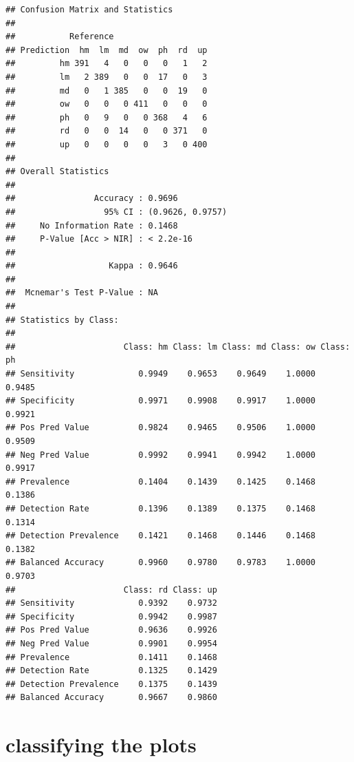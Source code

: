 \documentclass[
]{article}
\newenvironment{Shaded}{\begin{snugshade}}{\end{snugshade}}
\newcommand{\CommentTok}[1]{\textcolor[rgb]{0.56,0.35,0.01}{\textit{#1}}}
\newcommand{\FunctionTok}[1]{\textcolor[rgb]{0.13,0.29,0.53}{\textbf{#1}}}
\newcommand{\NormalTok}[1]{#1}
\newcommand{\SpecialCharTok}[1]{\textcolor[rgb]{0.81,0.36,0.00}{\textbf{#1}}}
\begin{document}
\begin{Shaded}
\end{Shaded}

\begin{verbatim}
## Confusion Matrix and Statistics
## 
##           Reference
## Prediction  hm  lm  md  ow  ph  rd  up
##         hm 391   4   0   0   0   1   2
##         lm   2 389   0   0  17   0   3
##         md   0   1 385   0   0  19   0
##         ow   0   0   0 411   0   0   0
##         ph   0   9   0   0 368   4   6
##         rd   0   0  14   0   0 371   0
##         up   0   0   0   0   3   0 400
## 
## Overall Statistics
##                                           
##                Accuracy : 0.9696          
##                  95% CI : (0.9626, 0.9757)
##     No Information Rate : 0.1468          
##     P-Value [Acc > NIR] : < 2.2e-16       
##                                           
##                   Kappa : 0.9646          
##                                           
##  Mcnemar's Test P-Value : NA              
## 
## Statistics by Class:
## 
##                      Class: hm Class: lm Class: md Class: ow Class: ph
## Sensitivity             0.9949    0.9653    0.9649    1.0000    0.9485
## Specificity             0.9971    0.9908    0.9917    1.0000    0.9921
## Pos Pred Value          0.9824    0.9465    0.9506    1.0000    0.9509
## Neg Pred Value          0.9992    0.9941    0.9942    1.0000    0.9917
## Prevalence              0.1404    0.1439    0.1425    0.1468    0.1386
## Detection Rate          0.1396    0.1389    0.1375    0.1468    0.1314
## Detection Prevalence    0.1421    0.1468    0.1446    0.1468    0.1382
## Balanced Accuracy       0.9960    0.9780    0.9783    1.0000    0.9703
##                      Class: rd Class: up
## Sensitivity             0.9392    0.9732
## Specificity             0.9942    0.9987
## Pos Pred Value          0.9636    0.9926
## Neg Pred Value          0.9901    0.9954
## Prevalence              0.1411    0.1468
## Detection Rate          0.1325    0.1429
## Detection Prevalence    0.1375    0.1439
## Balanced Accuracy       0.9667    0.9860
\end{verbatim}

\section{classifying the plots}\label{classifying-the-plots-1}
\end{document}
